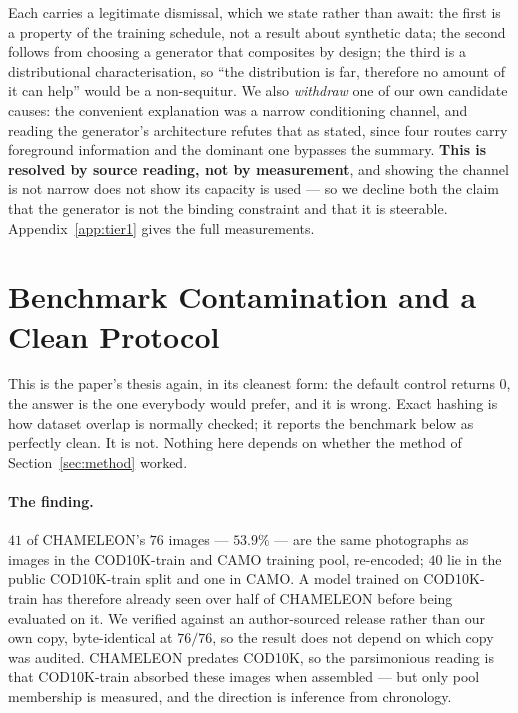 \documentclass{article} %
\begin{document}
Each carries a legitimate dismissal, which we state rather than await: the first is a property of the
training schedule, not a result about synthetic data; the second follows from choosing a generator
that composites by design; the third is a distributional characterisation, so ``the distribution is
far, therefore no amount of it can help'' would be a non-sequitur. We also \emph{withdraw} one of our
own candidate causes: the convenient explanation was a narrow conditioning channel, and reading the
generator's architecture refutes that as stated, since four routes carry foreground information and
the dominant one bypasses the summary. \textbf{This is resolved by source reading, not by
measurement}, and showing the channel is not narrow does not show its capacity is used --- so we
decline both the claim that the generator is not the binding constraint and that it is steerable.
Appendix~\ref{app:tier1} gives the full measurements.

\section{Benchmark Contamination and a Clean Protocol}
\label{sec:contamination}

This is the paper's thesis again, in its cleanest form: the default control returns $0$, the answer is
the one everybody would prefer, and it is wrong. Exact hashing is how dataset overlap is normally
checked; it reports the benchmark below as perfectly clean. It is not. Nothing here depends on whether
the method of Section~\ref{sec:method} worked.

\paragraph{The finding.} $41$ of CHAMELEON's $76$ images --- $53.9\%$ --- are the same photographs as
images in the COD10K-train and CAMO training pool, re-encoded; $40$ lie in the public COD10K-train
split and one in CAMO. A model trained on COD10K-train has therefore already seen over half of
CHAMELEON before being evaluated on it. We verified against an author-sourced release rather than our
own copy, byte-identical at $76/76$, so the result does not depend on which copy was audited.
CHAMELEON predates COD10K, so the parsimonious reading is that COD10K-train absorbed these images when
assembled --- but only pool membership is measured, and the direction is inference from chronology.
\end{document}
